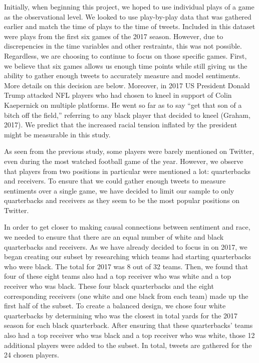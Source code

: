 \documentclass[12pt,twoside]{reedthesis}
\begin{document}
Initially, when beginning this project, we hoped to use individual plays
of a game as the observational level. We looked to use play-by-play data
that was gathered earlier and match the time of plays to the time of
tweets. Included in this dataset were plays from the first six games of
the 2017 season. However, due to discrepencies in the time variables and
other restraints, this was not possible. Regardless, we are choosing to
continue to focus on those specific games. First, we believe that six
games allows us enough time points while still giving us the ability to
gather enough tweets to accurately measure and model sentiments. More
details on this decision are below. Moreover, in 2017 US President
Donald Trump attacked NFL players who had chosen to kneel in support of
Colin Kaepernick on multiple platforms. He went so far as to say ``get
that son of a bitch off the field,'' referring to any black player that
decided to kneel (Graham, 2017). We predict that the increased racial
tension inflated by the president might be measurable in this study.

As seen from the previous study, some players were barely mentioned on
Twitter, even during the most watched football game of the year.
However, we observe that players from two positions in particular were
mentioned a lot: quarterbacks and receivers. To ensure that we could
gather enough tweets to measure sentiments over a single game, we have
decided to limit our sample to only quarterbacks and receivers as they
seem to be the most popular positions on Twitter.

In order to get closer to making causal connections between sentiment
and race, we needed to ensure that there are an equal number of white
and black quarterbacks and receivers. As we have already decided to
focus in on 2017, we began creating our subset by researching which
teams had starting quarterbacks who were black. The total for 2017 was 8
out of 32 teams. Then, we found that four of these eight teams also had
a top receiver who was white and a top receiver who was black. These
four black quarterbacks and the eight corresponding receivers (one white
and one black from each team) made up the first half of the subset. To
create a balanced design, we chose four white quarterbacks by
determining who was the closest in total yards for the 2017 season for
each black quarterback. After ensuring that these quarterbacks' teams
also had a top receiver who was black and a top receiver who was white,
those 12 additional players were added to the subset. In total, tweets
are gathered for the 24 chosen players.
\end{document}
